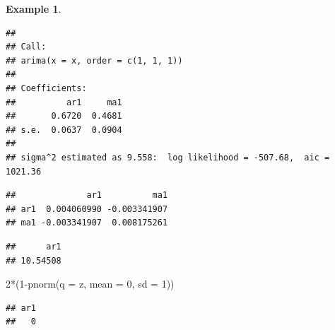 \documentclass[
]{book}
\newenvironment{Shaded}{\begin{snugshade}}{\end{snugshade}}
\newcommand{\AttributeTok}[1]{\textcolor[rgb]{0.77,0.63,0.00}{#1}}
\newcommand{\CommentTok}[1]{\textcolor[rgb]{0.56,0.35,0.01}{\textit{#1}}}
\newcommand{\DecValTok}[1]{\textcolor[rgb]{0.00,0.00,0.81}{#1}}
\newcommand{\FunctionTok}[1]{\textcolor[rgb]{0.00,0.00,0.00}{#1}}
\newcommand{\NormalTok}[1]{#1}
\newcommand{\OtherTok}[1]{\textcolor[rgb]{0.56,0.35,0.01}{#1}}
\newcommand{\SpecialCharTok}[1]{\textcolor[rgb]{0.00,0.00,0.00}{#1}}
\theoremstyle{definition}
\theoremstyle{definition}
\newtheorem{example}{Example}[chapter]
\theoremstyle{definition}
\theoremstyle{definition}
\theoremstyle{remark}
\begin{document}
\begin{example}
\begin{verbatim}
## 
## Call:
## arima(x = x, order = c(1, 1, 1))
## 
## Coefficients:
##          ar1     ma1
##       0.6720  0.4681
## s.e.  0.0637  0.0904
## 
## sigma^2 estimated as 9.558:  log likelihood = -507.68,  aic = 1021.36
\end{verbatim}

\begin{Shaded}
\end{Shaded}

\begin{verbatim}
##              ar1          ma1
## ar1  0.004060990 -0.003341907
## ma1 -0.003341907  0.008175261
\end{verbatim}

\begin{Shaded}
\end{Shaded}

\begin{verbatim}
##      ar1 
## 10.54508
\end{verbatim}

\begin{Shaded}
\begin{Highlighting}[]
  \DecValTok{2}\SpecialCharTok{*}\NormalTok{(}\DecValTok{1}\SpecialCharTok{{-}}\FunctionTok{pnorm}\NormalTok{(}\AttributeTok{q =}\NormalTok{ z, }\AttributeTok{mean =} \DecValTok{0}\NormalTok{, }\AttributeTok{sd =} \DecValTok{1}\NormalTok{))}
\end{Highlighting}
\end{Shaded}

\begin{verbatim}
## ar1 
##   0
\end{verbatim}

\begin{Shaded}
\end{Shaded}


\end{example}
\end{document}
